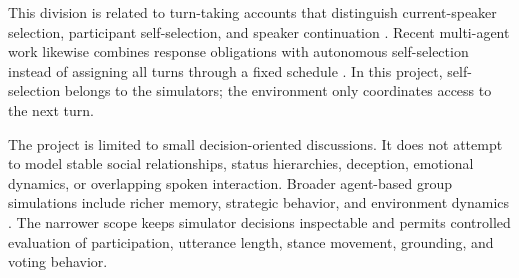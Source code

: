 This division is related to turn-taking accounts that distinguish current-speaker selection, participant self-selection, and speaker continuation \citep{sacks1974turntaking}. Recent multi-agent work likewise combines response obligations with autonomous self-selection instead of assigning all turns through a fixed schedule \citep{nonomura2025whospeaks}. In this project, self-selection belongs to the simulators; the environment only coordinates access to the next turn.

The project is limited to small decision-oriented discussions. It does not attempt to model stable social relationships, status hierarchies, deception, emotional dynamics, or overlapping spoken interaction. Broader agent-based group simulations include richer memory, strategic behavior, and environment dynamics \citep{gu2024agentgroupchat}. The narrower scope keeps simulator decisions inspectable and permits controlled evaluation of participation, utterance length, stance movement, grounding, and voting behavior.
